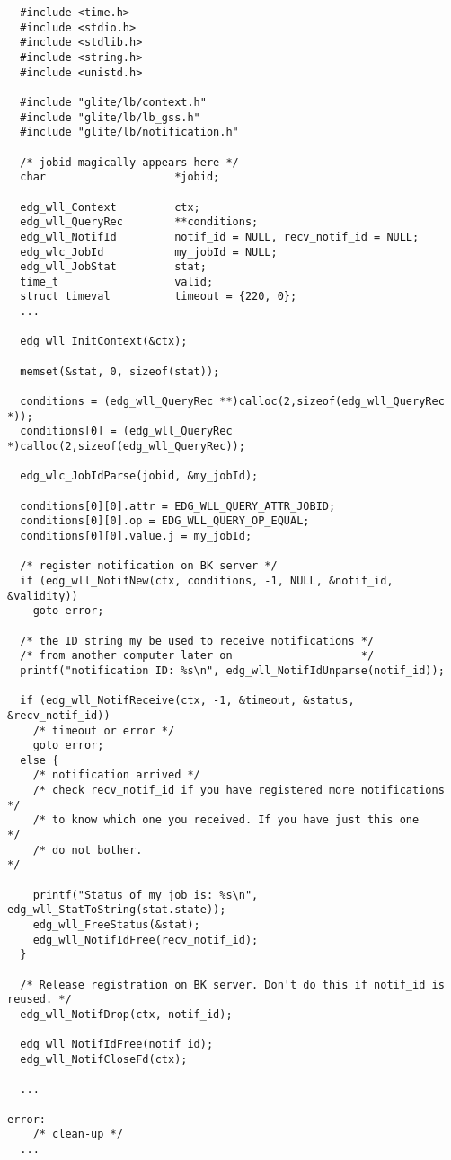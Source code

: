 \begin{verbatim}
  #include <time.h>
  #include <stdio.h>
  #include <stdlib.h>
  #include <string.h>
  #include <unistd.h>

  #include "glite/lb/context.h"
  #include "glite/lb/lb_gss.h"
  #include "glite/lb/notification.h"

  /* jobid magically appears here */
  char                    *jobid;

  edg_wll_Context         ctx;
  edg_wll_QueryRec        **conditions;
  edg_wll_NotifId         notif_id = NULL, recv_notif_id = NULL;
  edg_wlc_JobId           my_jobId = NULL;
  edg_wll_JobStat         stat;
  time_t                  valid;
  struct timeval          timeout = {220, 0};
  ...

  edg_wll_InitContext(&ctx);

  memset(&stat, 0, sizeof(stat));

  conditions = (edg_wll_QueryRec **)calloc(2,sizeof(edg_wll_QueryRec *));
  conditions[0] = (edg_wll_QueryRec *)calloc(2,sizeof(edg_wll_QueryRec));

  edg_wlc_JobIdParse(jobid, &my_jobId);

  conditions[0][0].attr = EDG_WLL_QUERY_ATTR_JOBID;
  conditions[0][0].op = EDG_WLL_QUERY_OP_EQUAL;
  conditions[0][0].value.j = my_jobId;

  /* register notification on BK server */
  if (edg_wll_NotifNew(ctx, conditions, -1, NULL, &notif_id, &validity))
    goto error;

  /* the ID string my be used to receive notifications */
  /* from another computer later on                    */
  printf("notification ID: %s\n", edg_wll_NotifIdUnparse(notif_id));

  if (edg_wll_NotifReceive(ctx, -1, &timeout, &status, &recv_notif_id))
    /* timeout or error */
    goto error;
  else {
    /* notification arrived */
    /* check recv_notif_id if you have registered more notifications */
    /* to know which one you received. If you have just this one     */
    /* do not bother.                                                */

    printf("Status of my job is: %s\n", edg_wll_StatToString(stat.state));
    edg_wll_FreeStatus(&stat);
    edg_wll_NotifIdFree(recv_notif_id);
  }
 
  /* Release registration on BK server. Don't do this if notif_id is reused. */
  edg_wll_NotifDrop(ctx, notif_id);

  edg_wll_NotifIdFree(notif_id);
  edg_wll_NotifCloseFd(ctx);
	
  ...

error:
	/* clean-up */
  ...

\end{verbatim}

